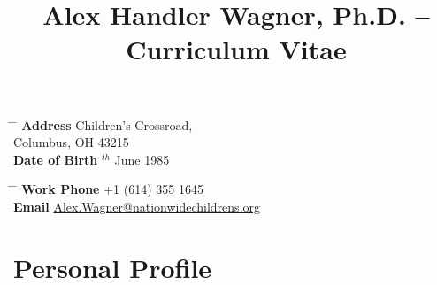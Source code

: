\documentclass[10pt]{article} %
\begin{document}

\title{Alex Handler Wagner, Ph.D. -- Curriculum Vitae} %


\parbox{0.5\textwidth}{ %
\begin{tabbing} %
\hspace{3cm} \= \hspace{4cm} \= \kill %
{\bf Address}  Children's Crossroad,\\ %
\> Columbus, OH 43215 \\ %
{\bf Date of Birth} $^{th}$ June 1985 \\ %
\end{tabbing}}
\hfill %
\parbox{0.5\textwidth}{ %
\begin{tabbing} %
\hspace{3cm} \= \hspace{4cm} \= \kill %
{\bf Work Phone} \> +1 (614) 355 1645 \\ %
{\bf Email} \> \href{mailto:Alex.Wagner@nationwidechildrens.org}{Alex.Wagner@nationwidechildrens.org} \\ %
\end{tabbing}}


\section{Personal Profile}
\end{document}

